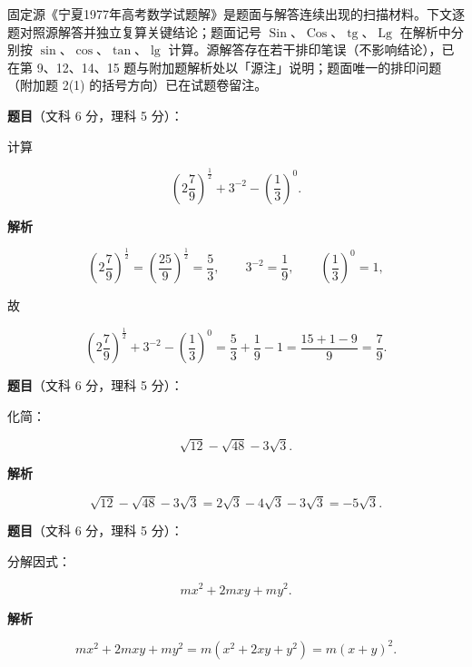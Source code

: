 

\begin{gktip}
固定源《宁夏1977年高考数学试题解》是题面与解答连续出现的扫描材料。下文逐题对照源解答并独立复算关键结论；题面记号 $\operatorname{Sin}$、$\operatorname{Cos}$、$\operatorname{tg}$、$\operatorname{Lg}$ 在解析中分别按 $\sin$、$\cos$、$\tan$、$\lg$ 计算。源解答存在若干排印笔误（不影响结论），已在第 9、12、14、15 题与附加题解析处以「源注」说明；题面唯一的排印问题（附加题 2(1) 的括号方向）已在试题卷留注。
\end{gktip}

\begin{answer}

\textbf{题目}（文科 6 分，理科 5 分）：

计算

\nopagebreak[4]
\[
\left(2\frac79\right)^{\frac12}+3^{-2}-\left(\frac13\right)^0.
\]

\textbf{解析}

\nopagebreak[4]
\[
\left(2\frac79\right)^{\frac12}
=\left(\frac{25}{9}\right)^{\frac12}
=\frac53,
\qquad
3^{-2}=\frac19,
\qquad
\left(\frac13\right)^0=1,
\]

故

\nopagebreak[4]
\[
\left(2\frac79\right)^{\frac12}+3^{-2}-\left(\frac13\right)^0
=\frac53+\frac19-1
=\frac{15+1-9}{9}
=\frac79.
\]


\end{answer}
\begin{answer}

\textbf{题目}（文科 6 分，理科 5 分）：

化简：

\nopagebreak[4]
\[
\sqrt{12}-\sqrt{48}-3\sqrt3.
\]

\textbf{解析}

\nopagebreak[4]
\[
\sqrt{12}-\sqrt{48}-3\sqrt3
=2\sqrt3-4\sqrt3-3\sqrt3
=-5\sqrt3.
\]


\end{answer}
\begin{answer}

\textbf{题目}（文科 6 分，理科 5 分）：

分解因式：

\nopagebreak[4]
\[
mx^2+2mxy+my^2.
\]

\textbf{解析}

\nopagebreak[4]
\[
mx^2+2mxy+my^2
=m\left(x^2+2xy+y^2\right)
=m(x+y)^2.
\]


\end{answer}
